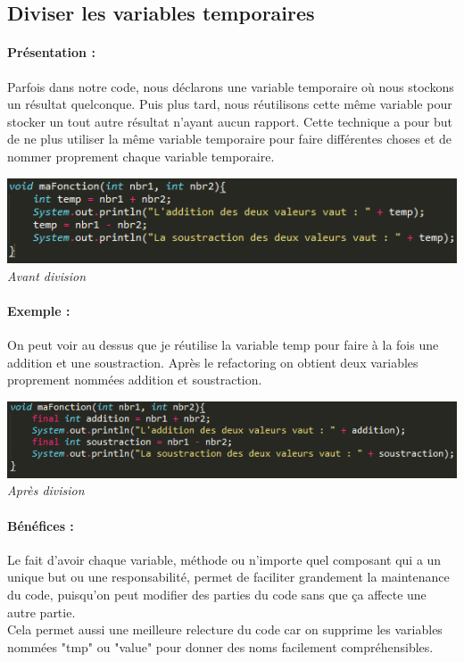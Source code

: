 \documentclass[a4paper,twoside,12pt,openright]{report}
\begin{document}
\newpage

\subsection{Diviser les variables temporaires}
\paragraph{Présentation :}
Parfois dans notre code, nous déclarons une variable temporaire où nous stockons un résultat quelconque. Puis plus tard, nous réutilisons cette même variable pour stocker un tout autre résultat n'ayant aucun rapport.
Cette technique a pour but de ne plus utiliser la même variable temporaire pour faire différentes choses et de nommer proprement chaque variable temporaire.

\begin{center}
\includegraphics[scale=1]{Image/Diviser_Temp.png}\\
\itshape{Avant division}
\end{center}

\paragraph{Exemple :}
On peut voir au dessus que je réutilise la variable temp pour faire à la fois une addition et une soustraction. Après le refactoring on obtient deux variables proprement nommées addition et soustraction.

\begin{center}
\includegraphics[scale=1]{Image/Diviser_Temp2.png}\\
\itshape{Après division}
\end{center}

\paragraph{Bénéfices :}
Le fait d'avoir chaque variable, méthode ou n'importe quel composant qui a un unique but ou une responsabilité, permet de faciliter grandement la maintenance du code, puisqu'on peut modifier des parties du code sans que ça affecte une autre partie.\\
Cela permet aussi une meilleure relecture du code car on supprime les variables nommées "tmp" ou "value" pour donner des noms facilement compréhensibles.\\
\end{document}
